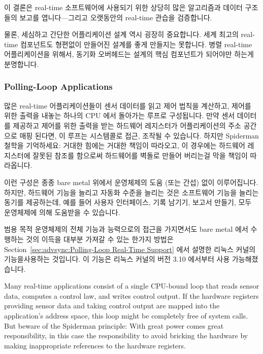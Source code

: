 이 결론은 real-time 소프트웨어에 사용되기 위한 상당히 많은 알고리즘과 데이터
구조들의 보고를 엽니다---그리고 오랫동안의 real-time 관습을 검증합니다.

물론, 세심하고 간단한 어플리케이션 설계 역시 굉장히 중요합니다.
세계 최고의 real-time 컴포넌트도 형편없이 만들어진 설계를 좋게 만들지는
못합니다.
병렬 real-time 어플리케이션을 위해서, 동기화 오버헤드는 설계의 핵심 컴포넌트가
되어야만 하는게 분명합니다.

\subsubsection{Polling-Loop Applications}
\label{sec:advsync:Polling-Loop Applications}

많은 real-time 어플리케이션들이 센서 데이터를 읽고 제어 법칙을 계산하고, 제어를
위한 출력을 내놓는 하나의 CPU 에서 돌아가는 루프로 구성됩니다.
만약 센서 데이터를 제공하고 제어를 위한 출력을 받는 하드웨어 레지스터가
어플리케이션의 주소 공간으로 매핑 된다면, 이 루프는 시스템콜로 접근, 조작될 수
있습니다.
하지만 Spiderman 철학을 기억하세요: 거대한 힘에는 거대한 책임이 따라오고, 이
경우에는 하드웨어 레지스터에 잘못된 참조를 함으로써 하드웨어를 벽돌로 만들어
버리는걸 막을 책임이 따라옵니다.

이런 구성은 종종 bare metal 위에서 운영체제의 도움 (또는 간섭) 없이
이루어집니다.
하지만, 하드웨어 기능을 늘리고 자동화 수준을 늘리는 것은 소프트웨어 기능을
늘리는 동기를 제공하는데, 예를 들어 사용자 인터페이스, 기록 남기기, 보고서
만들기, 모두 운영체제에 의해 도움받을 수 있습니다.

범용 목적 운영체제의 전체 기능과 능력으로의 접근을 가지면서도 bare metal 에서
수행하는 것의 이득을 대부분 가져갈 수 있는 한가지 방법은
Section~\ref{sec:advsync:Polling-Loop Real-Time Support} 에서 설명한 리눅스
커널의  기능을사용하는 것입니다.
이 기능은 리눅스 커널의 버전 3.10 에서부터 사용 가능해졌습니다.
\iffalse

Many real-time applications consist of a single CPU-bound loop that
reads sensor data, computes a control law, and writes control output.
If the hardware registers providing sensor data and taking control
output are mapped into the application's address space, this loop
might be completely free of system calls.
But beware of the Spiderman principle: With great power comes great
responsibility, in this case the responsibility to avoid bricking the
hardware by making inappropriate references to the hardware registers.

